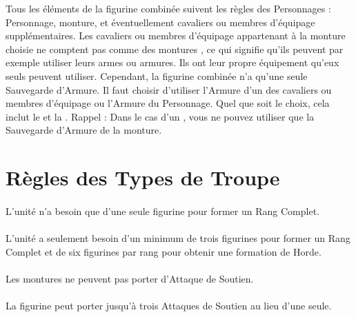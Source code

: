 Tous les éléments de la figurine combinée suivent les règles des Personnages : Personnage, monture, et éventuellement cavaliers ou membres d'équipage supplémentaires. Les cavaliers ou membres d'équipage appartenant à la monture choisie ne comptent pas comme des \og montures \fg{}, ce qui signifie qu'ils peuvent par exemple utiliser leurs armes ou armures. Ils ont leur propre équipement qu'eux seuls peuvent utiliser. Cependant, la figurine combinée n'a qu'une seule Sauvegarde d'Armure. Il faut choisir d'utiliser l'Armure d'un des cavaliers ou membres d'équipage ou l'Armure du Personnage. Quel que soit le choix, cela inclut le \barding{} et la \mountsprotection{}. Rappel : Dans le cas d'un \riddenmonster{}, vous ne pouvez utiliser que la Sauvegarde d'Armure de la monture.

\section{Règles des Types de Troupe}

\paragraph{\monsterranks}

L'unité n'a besoin que d'une seule figurine pour former un Rang Complet.

\paragraph{\monstrousranks}

L'unité a seulement besoin d'un minimum de trois figurines pour former un Rang Complet et de six figurines par rang pour obtenir une formation de Horde.

\paragraph{\cavalrysupport}

Les montures ne peuvent pas porter d'Attaque de Soutien.

\paragraph{\monstroussupport}

La figurine peut porter jusqu'à trois Attaques de Soutien au lieu d'une seule.

\newpage
\paragraph{\combinedprofile}

